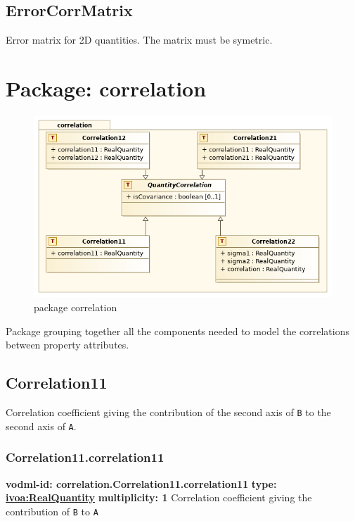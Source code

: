   \subsection{ErrorCorrMatrix}
  \label{sect:error.ErrorCorrMatrix}
  Error matrix for 2D quantities. The matrix must be symetric.

\pagebreak
\section{Package: correlation }
  \begin{figure}[h]
    \includegraphics[width=1.0\textwidth]{../model/correlation.png}
    \caption{package correlation}
    \label{fig:correlation}
  \end{figure}




  Package grouping together all the components needed to model the correlations between property attributes.

  \subsection{Correlation11}
  \label{sect:correlation.Correlation11}
    Correlation coefficient giving the contribution of the second axis of \texttt{B} to the second axis of \texttt{A}.

    \subsubsection{Correlation11.correlation11}
      \textbf{vodml-id: correlation.Correlation11.correlation11} \newline
      \textbf{type: \hyperref[sect:ivoa]{ivoa:RealQuantity}} \newline
      \textbf{multiplicity: 1} \newline 
      Correlation coefficient giving the contribution of \texttt{B} to \texttt{A}

